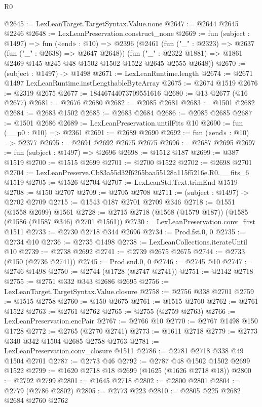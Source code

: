 \begin{lexlean}{R0}
\begin{coremodule}
@2645 := LexLeanTarget.TargetSyntax.Value.none
@2647 := @2644 @2645 @2246
@2648 := LexLeanPreservation.construct_none
@2669 := fun (subject : @1497) =>
  fun («end» : @10) =>
  @2396
    (@2461
      (fun ("_" : @2323) => @2637 (fun ("_" : @2638) => @2647 @2648))
      (fun ("_" : @2322 @1881) => @1861 @2469 @145 @245 @48 @1502 @1502 @1522 @2645 @2555 @2648))
@2670 := (subject : @1497) -> @1498
@2671 := LexLeanRuntime.length
@2674 := @2671 @1497 LexLeanRuntime.instLengthableByteArray
@2675 := @2674 @1519
@2676 := @2319 @2675
@2677 := 18446744073709551616
@2680 := @13 @2677 (@16 @2677)
@2681 := @2676 @2680
@2682 := @2085 @2681
@2683 := @1501 @2682
@2684 := @2683 @1502
@2685 := @2683 @2684
@2686 := @2085 @2685
@2687 := @1501 @2686
@2689 := LexLeanPreservation.untilFits @10
@2690 := fun (__p0 : @10) => @2361
@2691 := @2689 @2690
@2692 := fun («end» : @10) => @2377
@2695 := @2691 @2692 @2675 @2675
@2696 := @2687 @2695
@2697 := fun (subject : @1497) => @2696
@2698 := @1512 @187
@2699 := @387 @1519
@2700 := @1515 @2699
@2701 := @2700 @1522
@2702 := @2698 @2701
@2704 := LexLeanPreserve.Cb83a55d32f6265baa55128a115f5216e.R0.__fits_6 @1519
@2705 := @1526 @2704
@2707 := LexLeanStd.Text.trimEnd @1519
@2708 := @150 @2707
@2709 := @2705 @2708
@2711 := (subject : @1497) -> @2702 @2709
@2715 := @1543 @187 @2701 @2709 @346
@2718 := @1551 (@1558 @2699) @1561
@2728 := @2715 @2718 (@1568 (@1579 @187)) (@1585 (@1586 (@1587 @346) @2701 @1561))
@2730 := LexLeanPreservation.conv_first @1511
@2733 := @2730 @2718 @344 @2696
@2734 := Prod.fst.{0, 0}
@2735 := @2734 @10
@2736 := @2735 @1498
@2738 := LexLeanCollections.iterateUntil @10
@2739 := @2738 @2692
@2741 := @2739 @2675 @2675
@2744 := @2733 (@150 (@2736 @2741))
@2745 := Prod.snd.{0, 0}
@2746 := @2745 @10
@2747 := @2746 @1498
@2750 := @2744 (@1728 (@2747 @2741))
@2751 := @2142 @2718
@2755 := @2751 @332 @343 @2686 @2695
@2756 := LexLeanTarget.TargetSyntax.Value.closure
@2758 := @2756 @338 @2701
@2759 := @1515 @2758
@2760 := @150 @2675
@2761 := @1515 @2760
@2762 := @2761 @1522
@2763 := @2761 @2762
@2765 := @2755 (@2759 @2763)
@2766 := LexLeanPreservation.encPair
@2767 := @2766 @10
@2770 := @2767 @1498 @150 @1728
@2772 := @2765 (@2770 @2741)
@2773 := @1611 @2718
@2779 := @2773 @340 @342 @1504 @2685 @2758 @2763
@2781 := LexLeanPreservation.conv_closure @1511
@2786 := @2781 @2718 @338 @49 @1504 @2701
@2787 := @2773 @46
@2792 := @2787 @48 @1502 @1502 @2699 @1522
@2799 := @1620 @2718 @18 @2699 (@1625 (@1626 @2718 @18))
@2800 := @2792 @2799
@2801 := @1645 @2718
@2802 := @2800 @2801
@2804 := @2779 (@2786 @2802)
@2805 := @2773 @223
@2810 := @2805 @225 @2682 @2684 @2760 @2762

\end{coremodule}
\end{lexlean}
